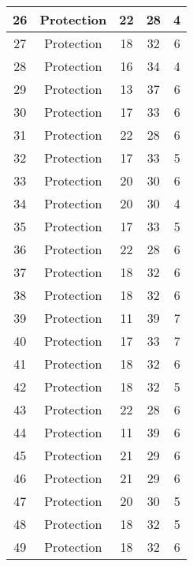\documentclass[results.tex]{subfiles}
\begin{document}
\begin{center}
\begin{tabular}{| c || c | c | c | c |}
    \hline
    26 & Protection & 22 & 28 & 4 \\ 
    \hline
    27 & Protection & 18 & 32 & 6 \\ 
    \hline
    28 & Protection & 16 & 34 & 4 \\ 
    \hline
    29 & Protection & 13 & 37 & 6 \\ 
    \hline
    30 & Protection & 17 & 33 & 6 \\ 
    \hline
    31 & Protection & 22 & 28 & 6 \\ 
    \hline
    32 & Protection & 17 & 33 & 5 \\ 
    \hline
    33 & Protection & 20 & 30 & 6 \\ 
    \hline
    34 & Protection & 20 & 30 & 4 \\ 
    \hline
    35 & Protection & 17 & 33 & 5 \\ 
    \hline
    36 & Protection & 22 & 28 & 6 \\ 
    \hline
    37 & Protection & 18 & 32 & 6 \\ 
    \hline
    38 & Protection & 18 & 32 & 6 \\ 
    \hline
    39 & Protection & 11 & 39 & 7 \\ 
    \hline
    40 & Protection & 17 & 33 & 7 \\ 
    \hline
    41 & Protection & 18 & 32 & 6 \\ 
    \hline
    42 & Protection & 18 & 32 & 5 \\ 
    \hline
    43 & Protection & 22 & 28 & 6 \\ 
    \hline
    44 & Protection & 11 & 39 & 6 \\ 
    \hline
    45 & Protection & 21 & 29 & 6 \\ 
    \hline
    46 & Protection & 21 & 29 & 6 \\ 
    \hline
    47 & Protection & 20 & 30 & 5 \\ 
    \hline
    48 & Protection & 18 & 32 & 5 \\ 
    \hline
    49 & Protection & 18 & 32 & 6 \\ 
    \hline   \end{tabular}
\end{center}
\end{document}
